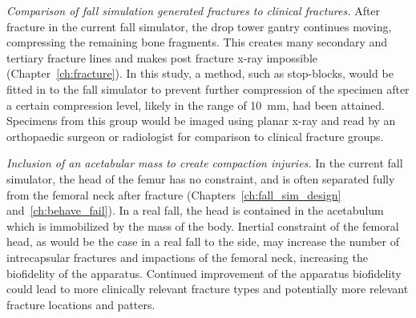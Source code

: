 \textit{Comparison of fall simulation generated fractures to clinical fractures.}
After fracture in the current fall simulator, the drop tower gantry continues moving, compressing the remaining bone fragments.
This creates many secondary and tertiary fracture lines and makes post fracture x-ray impossible (Chapter~\ref{ch:fracture}).
In this study, a method, such as stop-blocks, would be fitted in to the fall simulator to prevent further compression of the specimen after a certain compression level, likely in the range of 10~\ac{mm}, had been attained.
Specimens from this group would be imaged using planar x-ray and read by an orthopaedic surgeon or radiologist for comparison to clinical fracture groups.

\textit{Inclusion of an acetabular mass to create compaction injuries.}
In the current fall simulator, the head of the femur has no constraint, and is often separated fully from the femoral neck after fracture (Chapters~\ref{ch:fall_sim_design} and~\ref{ch:behave_fail}).
In a real fall, the head is contained in the acetabulum which is immobilized by the mass of the body.
Inertial constraint of the femoral head, as would be the case in a real fall to the side, may increase the number of intrecapsular fractures and impactions of the femoral neck, increasing the biofidelity of the apparatus.
Continued improvement of the apparatus biofidelity could lead to more clinically relevant fracture types and potentially more relevant fracture locations and patters.